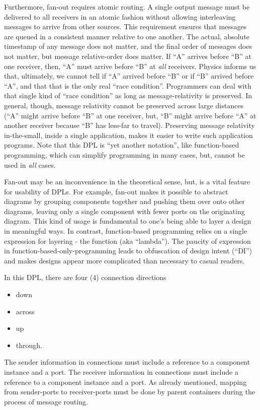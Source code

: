 \documentclass[10pt,anonymous,review]{acmart}
\begin{document}
Furthermore, fan-out requires atomic routing. A single output message must be delivered to all receivers in an atomic fashion without allowing interleaving messages to arrive from other sources. This requirement ensures that messages are queued in a consistent manner relative to one another. The actual, absolute timestamp of any message does not matter, and the final order of messages does not matter, but message relative-order does matter. If “A” arrives before “B” at one receiver, then, “A” must arrive before “B” at \emph{all} receivers. Physics informs us that, ultimately, we cannot tell if “A” arrived before “B” or if “B” arrived before “A”, and that that is the only real “race condition”. Programmers can deal with that single kind of “race condition” as long as message-relativity is preserved. In general, though, message relativity cannot be preserved across large distances (“A” might arrive before “B” at one receiver, but, “B” might arrive before “A” at another receiver because “B” has less-far to travel). Preserving message relativity in-the-small, inside a single application, makes it easier to write such application programs. Note that this DPL is “yet another notation”, like function-based programming, which can simplify programming in many cases, but, cannot be used in \emph{all} cases.

Fan-out may be an inconvenience in the theoretical sense, but, is a vital feature for usability of DPLs. For example, fan-out makes it possible to abstract diagrams by grouping components together and pushing them over onto other diagrams, leaving only a single component with fewer ports on the originating diagram. This kind of usage is fundamental to one’s being able to layer a design in meaningful ways. In contrast, function-based programming relies on a single expression for layering - the function (aka “lambda”). The paucity of expression in function-based-only-programming leads to obfuscation of design intent (“DI”) and makes designs appear more complicated than necessary to casual readers.



In this DPL, there are four (4) connection directions
\begin{itemize}
\item down
\item across
\item up
\item through.
\end{itemize}
The sender information in connections must include a reference to a component instance and a port.
The receiver information in connections must include a reference to a component instance and a port.
As already mentioned, mapping from sender-ports to receiver-ports must be done by parent containers during the process of message routing.
\end{document}
